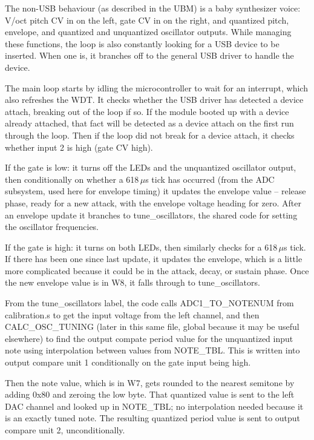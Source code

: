 The non-USB behaviour (as described in the UBM) is a baby synthesizer voice:
V/oct pitch CV in on the left, gate CV in on the right, and quantized pitch,
envelope, and quantized and unquantized oscillator outputs.  While managing
these functions, the loop is also constantly looking for a USB device to be
inserted.  When one is, it branches off to the general USB driver to handle
the device.

The main loop starts by idling the microcontroller to wait for an interrupt,
which also refreshes the WDT.  It checks whether the USB driver has detected
a device attach, breaking out of the loop if so.  If the module booted up
with a device already attached, that fact will be detected as a device
attach on the first run through the loop.  Then if the loop did not break
for a device attach, it checks whether input 2 is high (gate CV high).

If the gate is low:  it turns off the LEDs and the unquantized oscillator
output, then conditionally on whether a 618\,$\mu$s tick has occurred (from
the ADC subsystem, used here for envelope timing) it updates the envelope
value -- release phase, ready for a new attack, with the envelope voltage
heading for zero.  After an envelope update it branches to
tune\_oscillators, the shared code for setting the oscillator frequencies.

If the gate is high: it turns on both LEDs, then similarly checks for a
618\,$\mu$s tick.  If there has been one since last update, it updates the
envelope, which is a little more complicated because it could be in the
attack, decay, or sustain phase.  Once the new envelope value is in W8, it
falls through to tune\_oscillators.

From the tune\_oscillators label, the code calls ADC1\_TO\_NOTENUM from
calibration.s to get the input voltage from the left channel, and then
CALC\_OSC\_TUNING (later in this same file, global because it may be useful
elsewhere) to find the output compate period value for the unquantized input
note using interpolation between values from NOTE\_TBL.  This is written into
output compare unit 1 conditionally on the gate input being high.

Then the note value, which is in W7, gets rounded to the nearest semitone by
adding 0x80 and zeroing the low byte.  That quantized value is sent to the
left DAC channel and looked up in NOTE\_TBL; no interpolation needed because
it is an exactly tuned note.  The resulting quantized period value is sent
to output compare unit 2, unconditionally.

